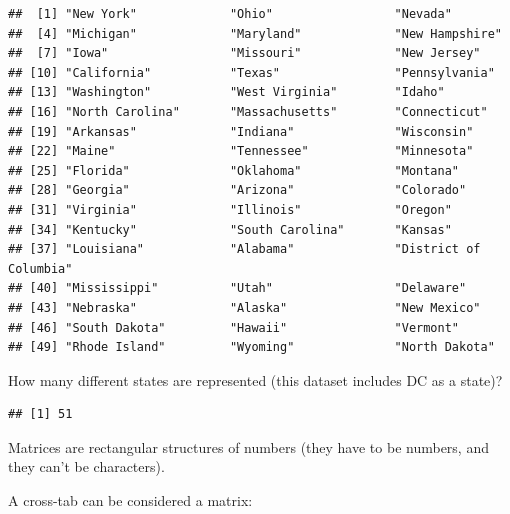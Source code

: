 \documentclass[]{book}
\newenvironment{Shaded}{\begin{snugshade}}{\end{snugshade}}
\newcommand{\KeywordTok}[1]{\textcolor[rgb]{0.13,0.29,0.53}{\textbf{#1}}}
\newcommand{\NormalTok}[1]{#1}
\newcommand{\OperatorTok}[1]{\textcolor[rgb]{0.81,0.36,0.00}{\textbf{#1}}}
\theoremstyle{definition}
\theoremstyle{definition}
\theoremstyle{definition}
\theoremstyle{remark}
\begin{document}
\begin{Shaded}
\begin{Highlighting}[]
\begin{Shaded}
\begin{Highlighting}[]
\begin{verbatim}
##  [1] "New York"             "Ohio"                 "Nevada"              
##  [4] "Michigan"             "Maryland"             "New Hampshire"       
##  [7] "Iowa"                 "Missouri"             "New Jersey"          
## [10] "California"           "Texas"                "Pennsylvania"        
## [13] "Washington"           "West Virginia"        "Idaho"               
## [16] "North Carolina"       "Massachusetts"        "Connecticut"         
## [19] "Arkansas"             "Indiana"              "Wisconsin"           
## [22] "Maine"                "Tennessee"            "Minnesota"           
## [25] "Florida"              "Oklahoma"             "Montana"             
## [28] "Georgia"              "Arizona"              "Colorado"            
## [31] "Virginia"             "Illinois"             "Oregon"              
## [34] "Kentucky"             "South Carolina"       "Kansas"              
## [37] "Louisiana"            "Alabama"              "District of Columbia"
## [40] "Mississippi"          "Utah"                 "Delaware"            
## [43] "Nebraska"             "Alaska"               "New Mexico"          
## [46] "South Dakota"         "Hawaii"               "Vermont"             
## [49] "Rhode Island"         "Wyoming"              "North Dakota"
\end{verbatim}

How many different states are represented (this dataset includes DC as a state)?

\begin{Shaded}
\end{Shaded}

\begin{verbatim}
## [1] 51
\end{verbatim}

Matrices are rectangular structures of numbers (they have to be numbers, and they can't be characters).

A cross-tab can be considered a matrix:

\begin{Shaded}
\end{Shaded}


\end{Highlighting}
\end{Shaded}
\end{Highlighting}
\end{Shaded}
\end{document}
